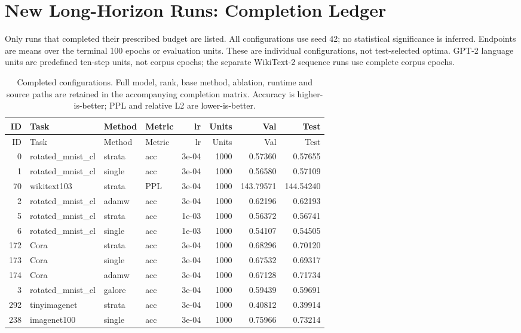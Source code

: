 \section{New Long-Horizon Runs: Completion Ledger}
\label{app:new-completions}
Only runs that completed their prescribed budget are listed. All configurations use seed 42; no statistical significance is inferred. Endpoints are means over the terminal 100 epochs or evaluation units. These are individual configurations, not test-selected optima. GPT-2 language units are predefined ten-step units, not corpus epochs; the separate WikiText-2 sequence runs use complete corpus epochs.
\begin{longtable}{rlllrrrr}
\caption{Completed configurations. Full model, rank, base method, ablation, runtime and source paths are retained in the accompanying completion matrix. Accuracy is higher-is-better; PPL and relative L2 are lower-is-better.}\\
\toprule ID & Task & Method & Metric & lr & Units & Val & Test \\ \midrule\endfirsthead
\toprule ID & Task & Method & Metric & lr & Units & Val & Test \\ \midrule\endhead
\rowcolor{oursbg}
0 & rotated\_mnist\_cl & strata & acc & 3e-04 & 1000 & 0.57360 & 0.57655 \\
1 & rotated\_mnist\_cl & single & acc & 3e-04 & 1000 & 0.56580 & 0.57109 \\
\rowcolor{oursbg}
70 & wikitext103 & strata & PPL & 3e-04 & 1000 & 143.79571 & 144.54240 \\
2 & rotated\_mnist\_cl & adamw & acc & 3e-04 & 1000 & 0.62196 & 0.62193 \\
\rowcolor{oursbg}
5 & rotated\_mnist\_cl & strata & acc & 1e-03 & 1000 & 0.56372 & 0.56741 \\
6 & rotated\_mnist\_cl & single & acc & 1e-03 & 1000 & 0.54107 & 0.54505 \\
\rowcolor{oursbg}
172 & Cora & strata & acc & 3e-04 & 1000 & 0.68296 & 0.70120 \\
173 & Cora & single & acc & 3e-04 & 1000 & 0.67532 & 0.69317 \\
174 & Cora & adamw & acc & 3e-04 & 1000 & 0.67128 & 0.71734 \\
3 & rotated\_mnist\_cl & galore & acc & 3e-04 & 1000 & 0.59439 & 0.59691 \\
\rowcolor{oursbg}
292 & tinyimagenet & strata & acc & 3e-04 & 1000 & 0.40812 & 0.39914 \\
238 & imagenet100 & single & acc & 3e-04 & 1000 & 0.75966 & 0.73214 \\

\end{longtable}
